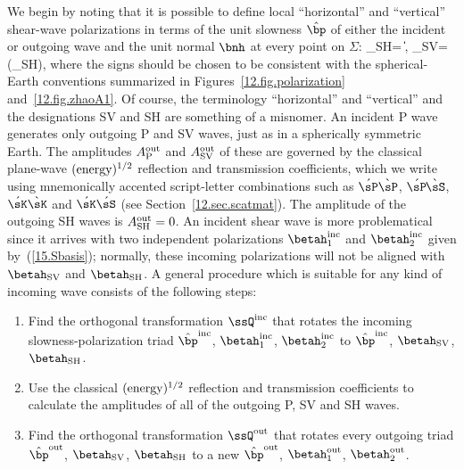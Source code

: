 We begin by noting that it is possible to define local
``horizontal'' and ``vertical'' shear-wave polarizations
in terms of the unit slowness $\hat{\bp}$ of either the
incident or outgoing wave and the unit normal $\bnh$ at
every point on $\Sigma$:
\eq \label{15.locSHSV}
\betah_{\rm SH}=\pm\hspace{0.2 mm}\frac{\hat{\bp}\times\bnh}
{\|\hat{\bp}\times\bnh\|},\qquad
\betah_{\rm SV}=\pm(\betah_{\rm SH}\times\hat{\bp}),
\en
where the signs should be chosen to be consistent
with the spherical-Earth conventions summarized in
Figures~\ref{12.fig.polarization} and~\ref{12.fig.zhaoA1}.
Of course, the terminology ``horizontal'' and ``vertical''
and the designations SV and SH are something of a misnomer.
An incident P wave generates only outgoing P and SV waves,
just as in a spherically symmetric Earth.  The amplitudes
$A_{\rm P}^{\rm out}$ and $A_{\rm SV}^{\rm out}$ of these are
governed by the classical plane-wave $({\rm energy})^{1/2}$ reflection
and transmission coefficients, which we write using mnemonically
accented script-letter combinations such as $\acute{\sP}\grave{\sP}$,
$\acute{\sP}\hspace{-0.3 mm}\grave{\sS}$, $\acute{\sK}\grave{\sK}$
and $\acute{\sK}\acute{\sS}$ (see Section~\ref{12.sec.scatmat}).
The amplitude of the outgoing SH waves is $A_{\rm SH}^{\rm out}=0$.
An incident shear wave is more problematical since it
arrives with two independent polarizations $\betah_1^{\rm inc}$
and $\betah_2^{\rm inc}$ given by~(\ref{15.Sbasis}); normally,
these incoming polarizations will
not be aligned with $\betah_{\rm SV}$ and
$\betah_{\rm SH}$.  A general procedure which is suitable
for any kind of incoming wave consists of the following steps:
\begin{enumerate}
\item Find the orthogonal transformation $\ssQ^{\rm inc}$
that rotates the incoming slowness-polarization triad
$\hat{\bp}^{\rm inc}$, $\betah_1^{\rm inc}$, $\betah_2^{\rm inc}$
to $\hat{\bp}^{\rm inc}$, $\betah_{\rm SV}$, $\betah_{\rm SH}$.
\item Use the classical $({\rm energy})^{1/2}$ reflection and
transmission coefficients to calculate the amplitudes of all of
the outgoing P, SV and SH waves.
\item Find the orthogonal transformation $\ssQ^{\rm out}$ that
rotates every outgoing triad $\hat{\bp}^{\rm out}$,
$\betah_{\rm SV}$, $\betah_{\rm SH}$ to a new
$\hat{\bp}^{\rm out}$, $\betah_1^{\rm out}$, $\betah_2^{\rm out}$.
\end{enumerate}
